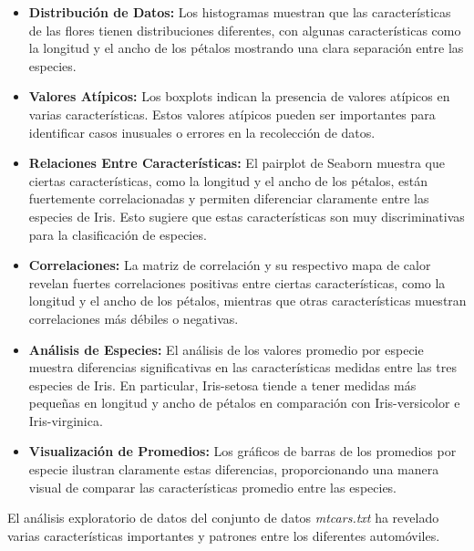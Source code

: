 \documentclass[conference]{IEEEtran}
\begin{document}
    \begin{itemize}
        \item \textbf{Distribución de Datos:} Los histogramas muestran que las características de las flores tienen distribuciones diferentes, con algunas características como la longitud y el ancho de los pétalos mostrando una clara separación entre las especies.
        
        \item \textbf{Valores Atípicos:} Los boxplots indican la presencia de valores atípicos en varias características. Estos valores atípicos pueden ser importantes para identificar casos inusuales o errores en la recolección de datos.
        
        \item \textbf{Relaciones Entre Características:} El pairplot de Seaborn muestra que ciertas características, como la longitud y el ancho de los pétalos, están fuertemente correlacionadas y permiten diferenciar claramente entre las especies de Iris. Esto sugiere que estas características son muy discriminativas para la clasificación de especies.
        
        \item \textbf{Correlaciones:} La matriz de correlación y su respectivo mapa de calor revelan fuertes correlaciones positivas entre ciertas características, como la longitud y el ancho de los pétalos, mientras que otras características muestran correlaciones más débiles o negativas.
        
        \item \textbf{Análisis de Especies:} El análisis de los valores promedio por especie muestra diferencias significativas en las características medidas entre las tres especies de Iris. En particular, Iris-setosa tiende a tener medidas más pequeñas en longitud y ancho de pétalos en comparación con Iris-versicolor e Iris-virginica.
        
        \item \textbf{Visualización de Promedios:} Los gráficos de barras de los promedios por especie ilustran claramente estas diferencias, proporcionando una manera visual de comparar las características promedio entre las especies.
    
    \end{itemize}

    El análisis exploratorio de datos del conjunto de datos \textit{mtcars.txt} ha revelado varias características importantes y patrones entre los diferentes automóviles.
\end{document}

